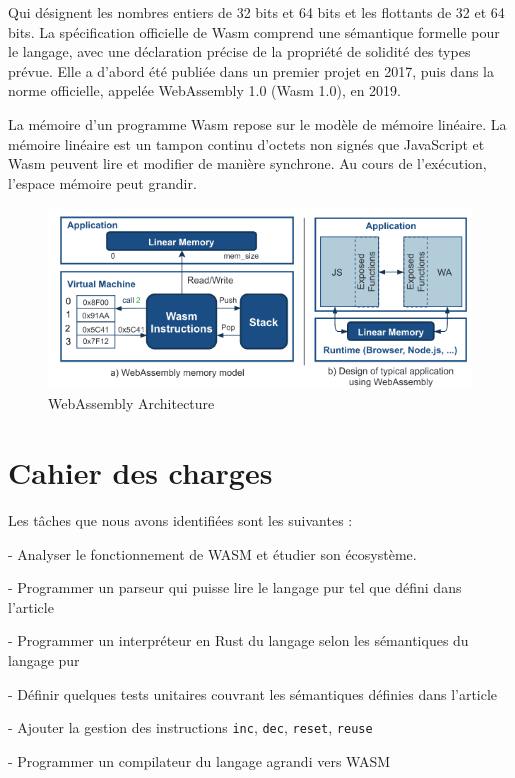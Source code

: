 \documentclass{rapportECL}
\begin{document}
Qui désignent les nombres entiers de 32 bits et 64 bits et les flottants de 32 et 64 bits.  
La spécification officielle de Wasm comprend une sémantique formelle pour le langage, 
avec une déclaration précise de la propriété de solidité des types prévue. 
Elle a d'abord été publiée dans un premier projet en 2017, puis dans la norme officielle, appelée WebAssembly 1.0 (Wasm 1.0), en 2019.
\par La mémoire d’un programme Wasm repose sur le modèle de mémoire linéaire\cite{haas_bringing_2017}. 
La mémoire linéaire est un tampon continu d'octets non signés  que JavaScript et Wasm peuvent lire et modifier de manière synchrone. 
Au cours de l’exécution, l’espace mémoire peut grandir. 

\begin{figure}[ht]
	\centering
	\includegraphics[scale=0.65]{logos/model_memory_wasm.png}	
	\caption{WebAssembly Architecture \cite{noauthor_wasmati_nodate}}
\end{figure}
\FloatBarrier 

\section{Cahier des charges}
Les tâches que nous avons identifiées sont les suivantes :

- Analyser le fonctionnement de WASM et étudier son écosystème.

- Programmer un parseur qui puisse lire le langage pur tel que défini dans l'article\cite{ullrich_counting_2020}

- Programmer un interpréteur en Rust du langage selon les sémantiques du langage pur

- Définir quelques tests unitaires couvrant les sémantiques définies dans l'article

- Ajouter la gestion des instructions \verb|inc|, \verb|dec|, \verb|reset|, \verb|reuse|

- Programmer un compilateur du langage agrandi vers WASM
\end{document}
